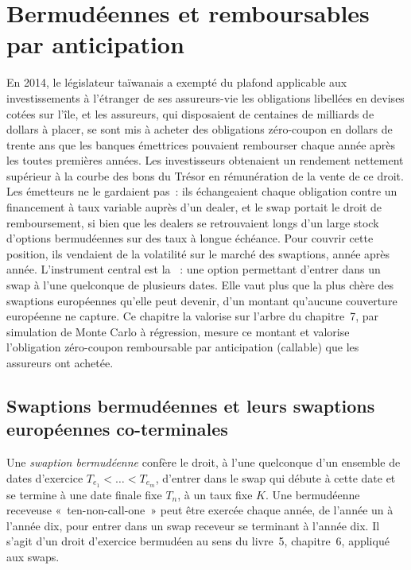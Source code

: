 \chapter{Bermudéennes et remboursables par anticipation}\label{ch:rc:bermudans-and-callables}

En 2014, le législateur taïwanais a exempté du plafond applicable aux investissements à l'étranger de ses assureurs-vie les obligations libellées en devises
cotées sur l'île, et les assureurs, qui disposaient de centaines de milliards de dollars à placer,
se sont mis à acheter des obligations zéro-coupon en dollars de trente ans
que les banques émettrices pouvaient rembourser chaque année après les toutes premières années.
Les investisseurs obtenaient un rendement nettement supérieur à la courbe des bons du Trésor
en rémunération de la vente de ce droit. Les émetteurs ne le gardaient pas~: ils échangeaient
chaque obligation contre un financement à taux variable auprès d'un dealer, et le swap portait le droit de remboursement, si bien que les dealers
se retrouvaient longs d'un large stock d'options bermudéennes sur des taux à longue échéance. Pour couvrir
cette position, ils vendaient de la volatilité sur le marché des swaptions, année après année. L'instrument central
est la ~: une option permettant d'entrer dans un swap à l'une quelconque de plusieurs dates.
Elle vaut plus que la plus chère des swaptions européennes qu'elle peut devenir, d'un montant qu'aucune couverture européenne ne capture.
Ce chapitre la valorise sur l'arbre du chapitre~7,
par simulation de Monte Carlo à régression, mesure ce montant et
valorise l'obligation zéro-coupon remboursable par anticipation (callable) que les assureurs ont achetée.

\section{Swaptions bermudéennes et leurs swaptions européennes co-terminales}

\begin{definition}\label{def:rc:bermudans-and-callables:bermudan}
Une \emph{swaption bermudéenne} confère le droit, à l'une quelconque
d'un ensemble de dates d'exercice $T_{e_1}<\dots<T_{e_m}$, d'entrer dans le swap qui débute à
cette date et se termine à une date finale fixe $T_n$, à un taux fixe $K$. Une
bermudéenne receveuse «~ten-non-call-one~» peut être exercée chaque année, de l'année un
à l'année dix, pour entrer dans un swap receveur se terminant à l'année dix. Il s'agit d'un droit d'exercice bermudéen au
sens du livre~5, chapitre~6, appliqué aux swaps.
\end{definition}

